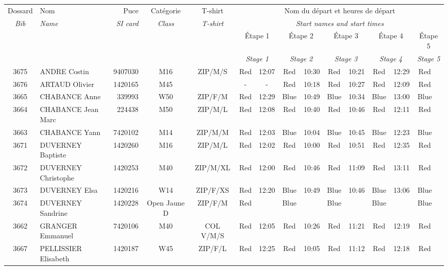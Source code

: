 \documentclass{report}
\begin{document}
  \begin{longtable}{|c|l|r|c|c|*{5}{cc|}}
    Dossard & Nom  & Puce    & Catégorie & T-shirt & \multicolumn{10}{c|}{Nom du départ et heures de départ} \\
    \itshape Bib     & \itshape Name & \itshape SI card & \itshape Class  & \itshape  T-shirt  & \multicolumn{10}{c|}{\itshape Start names and start times} \\
    \hline
    & & & & & \multicolumn{2}{c|}{Étape 1} & \multicolumn{2}{c|}{Étape 2} & \multicolumn{2}{c|}{Étape 3} & \multicolumn{2}{c|}{Étape 4} & \multicolumn{2}{c|}{Étape 5} \\
    & & & & & \multicolumn{2}{c|}{\itshape Stage 1} & \multicolumn{2}{c|}{\itshape Stage 2} & \multicolumn{2}{c|}{\itshape Stage 3} & \multicolumn{2}{c|}{\itshape Stage 4} & \multicolumn{2}{c|}{\itshape Stage 5} \\
    \hline
    3675 & ANDRE Costin & 9407030 & M16 & ZIP/M/S & Red & 12:07 & Red & 10:30 & Red & 10:21 & Red & 12:29 & Red &  \\
    3676 & ARTAUD Olivier & 1420165 & M45 &   & - &  - & Red & 10:18 & Red & 10:27 & Red & 12:09 & Red &  \\
    3665 & CHABANCE Anne & 339993 & W50 & ZIP/F/M & Red & 12:29 & Blue & 10:49 & Blue & 10:34 & Blue & 13:00 & Blue &  \\
    3664 & CHABANCE Jean Marc & 224438 & M50 & ZIP/M/L & Red & 12:08 & Red & 10:40 & Red & 10:46 & Red & 12:11 & Red &  \\
    3663 & CHABANCE Yann & 7420102 & M14 & ZIP/M/M & Red & 12:03 & Blue & 10:04 & Blue & 10:45 & Blue & 12:23 & Blue &  \\
    3671 & DUVERNEY Baptiste & 1420260 & M16 & ZIP/M/L & Red & 12:02 & Red & 10:00 & Red & 10:51 & Red & 12:35 & Red &  \\
    3672 & DUVERNEY Christophe & 1420253 & M40 & ZIP/M/XL & Red & 12:00 & Red & 10:46 & Red & 11:09 & Red & 13:11 & Red &  \\
    3673 & DUVERNEY Elsa & 1420216 & W14 & ZIP/F/XS & Red & 12:20 & Blue & 10:49 & Blue & 10:46 & Blue & 13:06 & Blue &  \\
    3674 & DUVERNEY Sandrine & 1420228 & Open Jaune D & ZIP/F/M & Red &   & Blue &   & Blue &   & Blue &   & Blue &  \\
    3662 & GRANGER Emmanuel & 7420106 & M40 & COL V/M/S & Red & 12:05 & Red & 10:26 & Red & 11:21 & Red & 12:19 & Red &  \\
    3667 & PELLISSIER Elisabeth & 1420187 & W45 & ZIP/F/L & Red & 12:25 & Red & 10:05 & Red & 11:12 & Red & 12:18 & Red &  \\

\end{longtable}
\end{document}
